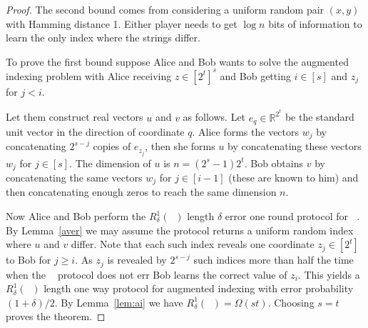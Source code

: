 \documentclass[9pt,letterpaper]{article}
\theoremstyle{remark}
\DeclareMathOperator{\URn}{UR^n}
\begin{document}
\begin{proof}
The second bound comes from considering a uniform random pair $(x,y)$ with
Hamming distance 1. Either player needs to get $\log n$ bits of information to
learn the only index where the strings differ.

To prove the first bound suppose Alice and Bob wants to
solve the augmented indexing problem with Alice receiving $z\in[2^t]^s$ and Bob
getting $i\in [s]$ and $z_j$ for $j<i$.

Let them construct real vectors $u$ and
$v$ as follows. Let $e_q\in\mathbb R^{2^t}$
be the standard unit vector in the direction of coordinate $q$. Alice forms
the vectors $w_j$ by concatenating $2^{s-j}$ copies of $e_{z_j}$, then she
forms $u$ by concatenating these vectors $w_j$ for
$j\in[s]$. The dimension of $u$ is $n=(2^s-1)2^t$. Bob
obtains $v$ by concatenating the same vectors $w_j$ for $j\in[i-1]$ (these are
known to him) and then
concatenating enough zeros to reach the same dimension
$n$.

Now Alice and Bob perform the $R^1_\delta(\URn)$ length
$\delta$ error one round protocol for $\URn$. By Lemma~\ref{aver} we
may assume the protocol returns a uniform random index where $u$ and $v$
differ. Note that each such index reveals one coordinate $z_j\in[2^t]$ to Bob
for $j\ge i$. As $z_j$ is revealed by $2^{s-j}$ such indices more than half the
time when the $\URn$ protocol does not err Bob learns the correct value of
$z_i$. This yields a $R^1_\delta(\URn)$ length one way protocol for augmented
indexing with error probability $(1+\delta)/2$. By Lemma~\ref{lem:ai} we have
$R^1_\delta(\URn)=\Omega(st)$. Choosing $s=t$ proves the theorem.
\end{proof}
\end{document}
